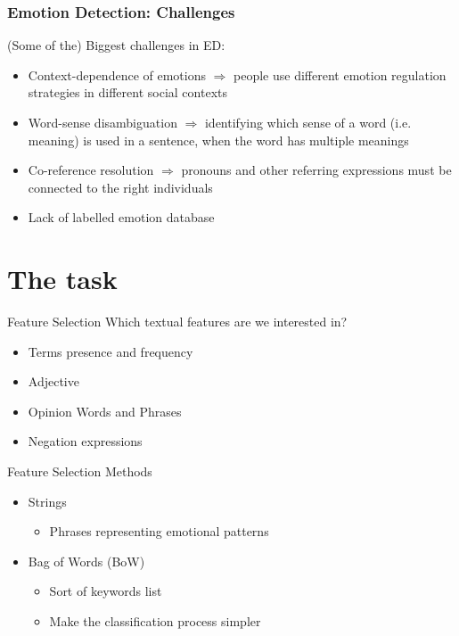 \documentclass[xcolor=dvipsnames]{beamer}
\begin{document}
\begin{frame}
\frametitle{Emotion Detection: Challenges}
(Some of the) Biggest challenges in ED:
\begin{itemize}
\item Context-dependence of emotions $\Rightarrow $ people use different emotion regulation strategies in different social contexts
\item Word-sense disambiguation $\Rightarrow $ identifying which sense of a word (i.e. meaning) is used in a sentence, when the word has multiple meanings
\item Co-reference resolution $\Rightarrow $ pronouns and other referring expressions must be connected to the right individuals
\item Lack of labelled emotion database
\end{itemize}
\end{frame}

\section{The task}
\begin{frame}{Feature Selection}
Which textual features are we interested in?
\begin{itemize}
\item Terms presence and frequency
\item Adjective
\item Opinion Words and Phrases
\item Negation expressions
\end{itemize}
\end{frame}

\begin{frame}{Feature Selection Methods}
\begin{itemize}
\item Strings
\begin{itemize}
\item Phrases representing emotional patterns
\end{itemize}
\item Bag of Words (BoW)
\begin{itemize}
\item Sort of keywords list
\item Make the classification process simpler
\end{itemize}
\end{itemize}
\end{frame}
\end{document}
